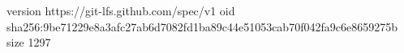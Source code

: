 version https://git-lfs.github.com/spec/v1
oid sha256:9be71229e8a3afc27ab6d7082fd1ba89c44e51053cab70f042fa9c6e8659275b
size 1297

